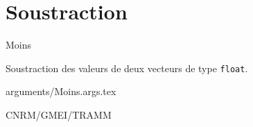 %
\section{Soustraction}

 {\sf Moins}

\bigskip
{}
Soustraction des valeurs de deux vecteurs de type {\tt float}.


\bigskip
 {arguments/Moins.args.tex}


\bigskip
{}


\bigskip
{}
CNRM/GMEI/TRAMM

\bigskip
{}
